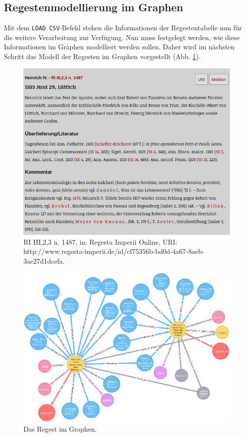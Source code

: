 \documentclass[ngerman,]{scrreprt}
\begin{document}
\hypertarget{regestenmodellierung-im-graphen-1}{%
\subsection{Regestenmodellierung im Graphen}\label{regestenmodellierung-im-graphen-1}}

Mit dem \texttt{LOAD\ CSV}-Befehl stehen die Informationen der Regestentabelle nun für die weitere Verarbeitung zur Verfügung. Nun muss festgelegt werden, wie diese Informationen im Graphen modelliert werden sollen. Daher wird im nächsten Schritt das Modell der Regesten im Graphen vorgestellt (Abb. \ref{ri2graph}).

\begin{figure}
\centering
\includegraphics{Bilder/RI2Graph/ReggH4-Nr-1487.png}
\caption{RI III,2,3 n. 1487, in: Regesta Imperii Online, URI: http://www.regesta-imperii.de/id/cf75356b-bd0d-4a67-8aeb-3ae27d1dcefa.}
\label{ri2graph}
\end{figure}

\begin{figure}
\centering
\includegraphics{Bilder/RI2Graph/ReggH4-Nr-1487imGraph.png}
\caption{Das Regest im Graphen.} 
\label{ri2graph2}
\end{figure}
\end{document}
